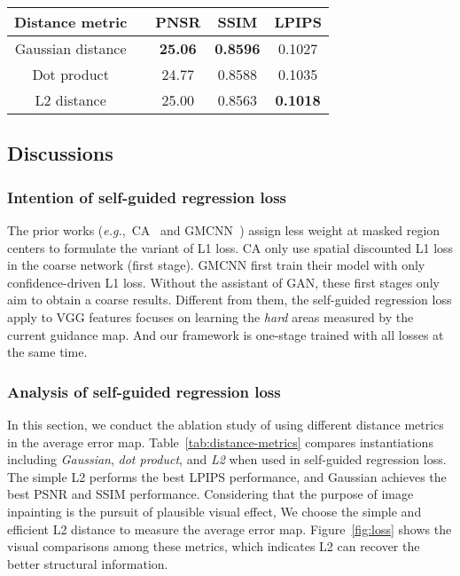 \documentclass[journal]{IEEEtran}
\newcommand{\eg}{\emph{e.g.}}
\begin{document}
\begin{table*}[htpb]
	\centering
	\caption{The comparison of self-guided regression loss with various distance metrics on Paris Streetview. Here,  represents the vector of the image  at position .}
	\label{tab:distance-metrics}
	\begin{tabular}{|c|c|c|c|c|}
		\hline
		Distance metric &  & PNSR & SSIM & LPIPS \\
		\hline
		Gaussian distance &  & \textbf{25.06} & \textbf{0.8596} & 0.1027 \\
		\hline
		Dot product &  & 24.77 & 0.8588 & 0.1035 \\
		\hline
		L2 distance &  & 25.00 & 0.8563 & \textbf{0.1018} \\
		\hline
	\end{tabular}
\end{table*}



\subsection{Discussions}
\subsubsection{Intention of self-guided regression loss}
The prior works (\eg,~CA~\cite{contextual-attention} and GMCNN~\cite{GMCNN}) assign less weight at masked region centers to formulate the variant of L1 loss. CA only use spatial discounted L1 loss in the coarse network (first stage). GMCNN first train their model with only confidence-driven L1 loss. Without the assistant of GAN, these first stages only aim to obtain a coarse results. Different from them, the self-guided regression loss apply to VGG features focuses on learning the \textit{hard} areas measured by the current guidance map. And our framework is one-stage trained with all losses at the same time.

\subsubsection{Analysis of self-guided regression loss}
In this section, we conduct the ablation study of using different distance metrics in the average error map. Table~\ref{tab:distance-metrics} compares instantiations including \textit{Gaussian}, \textit{dot product}, and \textit{L2} when used in self-guided regression loss. The simple L2 performs the best LPIPS performance, and Gaussian achieves the best PSNR and SSIM performance. Considering that the purpose of image inpainting is the pursuit of plausible visual effect, We choose the simple and efficient L2 distance to measure the average error map. Figure~\ref{fig:loss} shows the visual comparisons among these metrics, which indicates L2 can recover the better structural information.
\end{document}
